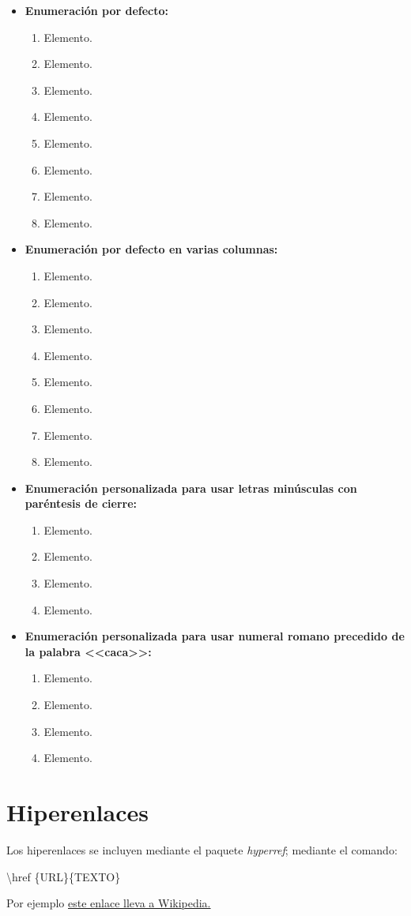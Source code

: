 \begin{itemize}
\item\textbf{Enumeración por defecto:}
	\begin{enumerate}
		\item Elemento.
		\item Elemento.
		\item Elemento.
		\item Elemento.
		\item Elemento.
		\item Elemento.
		\item Elemento.
		\item Elemento.
	\end{enumerate}
%
\item\textbf{Enumeración por defecto en varias columnas:}
	\begin{multicols}{3}
		\begin{enumerate}
		\item Elemento.
		\item Elemento.
		\item Elemento.
		\item Elemento.
		\item Elemento.
		\item Elemento.
		\item Elemento.
		\item Elemento.
	\end{enumerate}
\end{multicols}
%
\item\textbf{Enumeración personalizada para usar letras minúsculas con paréntesis de cierre:}
	\begin{enumerate}[label=\alph*)]
		\item Elemento.
		\item Elemento.
		\item Elemento.
		\item Elemento.
	\end{enumerate}
%
\item\textbf{Enumeración personalizada para usar numeral romano precedido de la palabra <<caca>>:}
	\begin{enumerate}[label=caca \Roman*]
		\item Elemento.
		\item Elemento.
		\item Elemento.
		\item Elemento.
	\end{enumerate}
\end{itemize}
%
\chapter{Hiperenlaces}
Los hiperenlaces se incluyen mediante el paquete \textit{hyperref}; mediante el comando:
\begin{center}
	\textbackslash href \{URL\}\{TEXTO\}
\end{center}

Por ejemplo \href{https://en.wikipedia.org}{este enlace lleva a Wikipedia.}